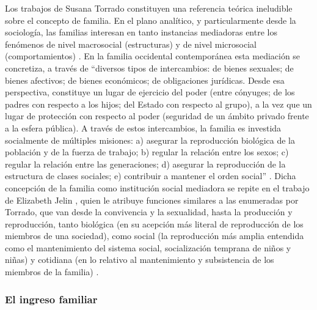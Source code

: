 Los trabajos de Susana Torrado constituyen una referencia teórica ineludible sobre el concepto de familia. En el plano analítico, y particularmente desde la sociología, las familias interesan en tanto instancias mediadoras entre los fenómenos de nivel macrosocial (estructuras) y de nivel microsocial (comportamientos) \cite{torrado1998}. En la familia occidental contemporánea esta mediación se concretiza, a través de “diversos tipos de intercambios: de bienes sexuales; de bienes afectivos; de bienes económicos; de obligaciones jurídicas. Desde esa perspectiva, constituye un lugar de ejercicio del poder (entre cónyuges; de los padres con respecto a los hijos; del Estado con respecto al grupo), a la vez que un lugar de protección con respecto al poder (seguridad de un ámbito privado frente a la esfera pública). A través de estos intercambios, la familia es investida socialmente de múltiples misiones: a) asegurar la reproducción biológica de la población y de la fuerza de trabajo; b) regular la relación entre los sexos; c) regular la relación entre las generaciones; d) asegurar la reproducción de la estructura de clases sociales; e) contribuir a mantener el orden social” \cite[p.~15]{torrado2003}. Dicha concepción de la familia como institución social mediadora se repite en el trabajo de Elizabeth Jelin \citeyear{jelin}, quien le atribuye funciones similares a las enumeradas por Torrado, que van desde la convivencia y la sexualidad, hasta la producción y reproducción, tanto biológica (en su acepción más literal de reproducción de los miembros de una sociedad), como social (la reproducción más amplia entendida como el mantenimiento del sistema social, socialización temprana de niños y niñas) y cotidiana (en lo relativo al mantenimiento y subsistencia de los miembros de la familia) \cite[p.~46]{jelin}.
	
\subsubsection{El ingreso familiar}
	
